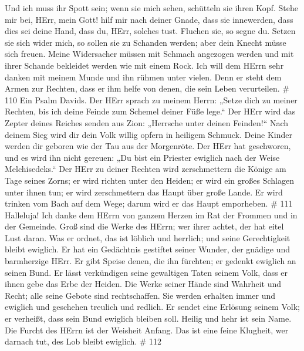  Und ich muss ihr Spott sein; wenn sie mich sehen,
schütteln sie ihren Kopf.  Stehe mir bei, HErr, mein Gott!
hilf mir nach deiner Gnade,  dass sie innewerden, dass dies
sei deine Hand, dass du, HErr, solches tust.  Fluchen sie,
so segne du. Setzen sie sich wider mich, so sollen sie zu Schanden
werden; aber dein Knecht müsse sich freuen.  Meine
Widersacher müssen mit Schmach angezogen werden und mit ihrer Schande
bekleidet werden wie mit einem Rock.  Ich will dem HErrn
sehr danken mit meinem Munde und ihn rühmen unter vielen. 
Denn er steht dem Armen zur Rechten, dass er ihm helfe von denen, die
sein Leben verurteilen. \# 110  Ein Psalm Davids. Der HErr
sprach zu meinem Herrn: „Setze dich zu meiner Rechten, bis ich deine
Feinde zum Schemel deiner Füße lege.``  Der HErr wird das
Zepter deines Reiches senden aus Zion: „Herrsche unter deinen
Feinden!{}``  Nach deinem Sieg wird dir dein Volk willig
opfern in heiligem Schmuck. Deine Kinder werden dir geboren wie der Tau
aus der Morgenröte.  Der HErr hat geschworen, und es wird
ihn nicht gereuen: „Du bist ein Priester ewiglich nach der Weise
Melchisedeks.``  Der HErr zu deiner Rechten wird
zerschmettern die Könige am Tage seines Zorns;  er wird
richten unter den Heiden; er wird ein großes Schlagen unter ihnen tun;
er wird zerschmettern das Haupt über große Lande.  Er wird
trinken vom Bach auf dem Wege; darum wird er das Haupt emporheben. \#
111  Halleluja! Ich danke dem HErrn von ganzem Herzen im Rat
der Frommen und in der Gemeinde.  Groß sind die Werke des
HErrn; wer ihrer achtet, der hat eitel Lust daran.  Was er
ordnet, das ist löblich und herrlich; und seine Gerechtigkeit bleibt
ewiglich.  Er hat ein Gedächtnis gestiftet seiner Wunder,
der gnädige und barmherzige HErr.  Er gibt Speise denen, die
ihn fürchten; er gedenkt ewiglich an seinen Bund.  Er lässt
verkündigen seine gewaltigen Taten seinem Volk, dass er ihnen gebe das
Erbe der Heiden.  Die Werke seiner Hände sind Wahrheit und
Recht; alle seine Gebote sind rechtschaffen.  Sie werden
erhalten immer und ewiglich und geschehen treulich und redlich.
 Er sendet eine Erlösung seinem Volk; er verheißt, dass sein
Bund ewiglich bleiben soll. Heilig und hehr ist sein Name. 
Die Furcht des HErrn ist der Weisheit Anfang. Das ist eine feine
Klugheit, wer darnach tut, des Lob bleibt ewiglich. \# 112 

